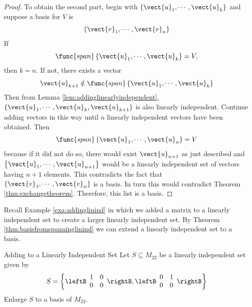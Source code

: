 \begin{proof}
To obtain the second part, begin with $\{\vect{u}_{1},\cdots ,\vect{u}
_{k}\}$ and suppose a basis for $V$ is 
\begin{equation*}
\left\{ \vect{v}_{1},\cdots ,\vect{v}_{n}\right\} 
\end{equation*}
If 
\begin{equation*}
\func{span}\left\{ \vect{u}_{1},\cdots ,\vect{u}_{k}\right\} =V,
\end{equation*}
then $k=n$. If not, there exists a vector 
\begin{equation*}
\vect{u}_{k+1}\notin \func{span}\left\{ \vect{u}_{1},\cdots ,\vect{u}
_{k}\right\}
\end{equation*}
Then from Lemma \ref{lem:addinglinearlyindependent}, $\{\vect{u}_{1},\cdots ,\vect{u}_{k},
\vect{u}_{k+1}\}$ is also linearly independent. Continue adding vectors in
this way until $n$ linearly independent vectors have been obtained. Then 
\begin{equation*}
\func{span}\left\{ \vect{u}_{1},\cdots ,\vect{u}_{n}\right\} =V
\end{equation*}
because if it did not do so, there would exist $\vect{u}_{n+1}$ as just
described and $\left\{ \vect{u}_{1},\cdots ,\vect{u}_{n+1}\right\} $
would be a linearly independent set of vectors having $n+1$ elements. This contradicts the fact that $\left\{ \vect{v}_{1},\cdots ,\vect{v}_{n}\right\} $ is a basis.
 In turn this would contradict Theorem \ref{thm:exchangetheorem}. Therefore, this list is a
basis. 
\end{proof}

Recall Example \ref{exa:addinglinind} in which we added a matrix to a linearly independent set to create a larger linearly independent set. By Theorem \ref{thm:basisfromspanninglinind} we can extend a linearly independent set to a basis.  

\begin{example}{Adding to a Linearly Independent Set}\label{exa:addinglinearindbasis}
Let $S \subseteq M_{22}$ be a linearly independent set given by 
\[
S  = \left\{ \leftB \begin{array}{rr}
1 & 0 \\
0 & 0 
\end{array} \rightB, \leftB \begin{array}{rr}
0 & 1 \\
0 & 0 
\end{array} \rightB \right\}
\]
Enlarge $S$ to a basis of $M_{22}$. 
\end{example}

